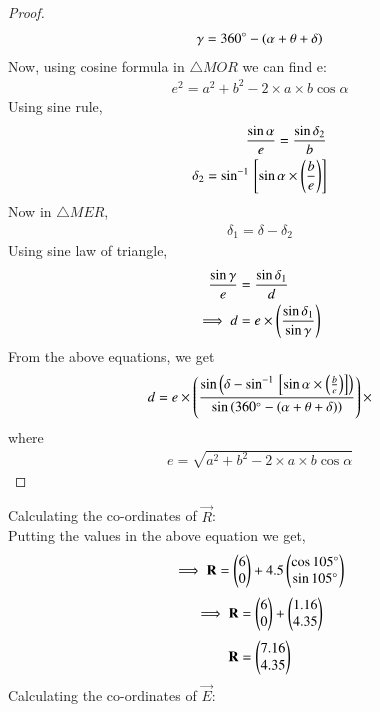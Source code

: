\documentclass[journal,12pt,twocolumn]{IEEEtran}
\begin{document}
\begin{proof}
\begin{align}
\gamma=360\degree-(\alpha+\theta+\delta)
\end{align}
 Now, using cosine formula in $\triangle MOR$ we can find e:
\begin{align}
 e^2=
a^2+b^2-2\times a \times b\cos{\alpha}
\end{align}
Using sine rule,
\begin{align}
    \frac{\sin{\alpha}}{e}=\frac{\sin{\delta_2}}{b}\\
    \delta_2=\sin^{-1}{}\left[\sin{\alpha}\times \left(\frac{b}{e}\right)\right]\\
\end{align}
  Now in $\triangle MER$,
  \begin{align}
  \delta_1=\delta-\delta_2
  \end{align}
Using sine law of triangle,
\begin{align}
    \frac{\sin{\gamma}}{e}&=\frac{\sin{\delta_1}}{d}\\
    \implies d&=e\times \left(\frac{\sin{\delta_1}}{\sin{\gamma}}\right)
\end{align}
From the above equations, we get
\begin{align}
d=e \times \left(\frac{\sin\left({\delta-\sin^{-1}{}\left[\sin{\alpha}\times \left(\frac{b}{e}\right)\right]}\right)}{\sin\left({360\degree-(\alpha+\theta+\delta)}\right)}\right)
\times 
\end{align}
where
\begin{align}
    e=\sqrt{a^2+b^2-2\times a \times b\cos{\alpha}}
\end{align}
\end{proof}
  Calculating the co-ordinates of $\vec{R}$:\\
 Putting the values in the above equation we get,
 \begin{align}
     \implies \mathbf{R}= \begin{pmatrix}6\\0\end{pmatrix}+4.5 \begin{pmatrix}\cos 105\degree\\ \sin 105\degree\end{pmatrix}
 \end{align}
 \begin{align}
     \implies \mathbf{R}= \begin{pmatrix}6\\0\end{pmatrix}+\begin{pmatrix}1.16\\4.35\end{pmatrix}
 \end{align}
 \begin{align}
     \mathbf{R}= \begin{pmatrix}7.16\\4.35\end{pmatrix}
 \end{align}
       Calculating the co-ordinates of $\vec{E}$:\\
\end{document}

